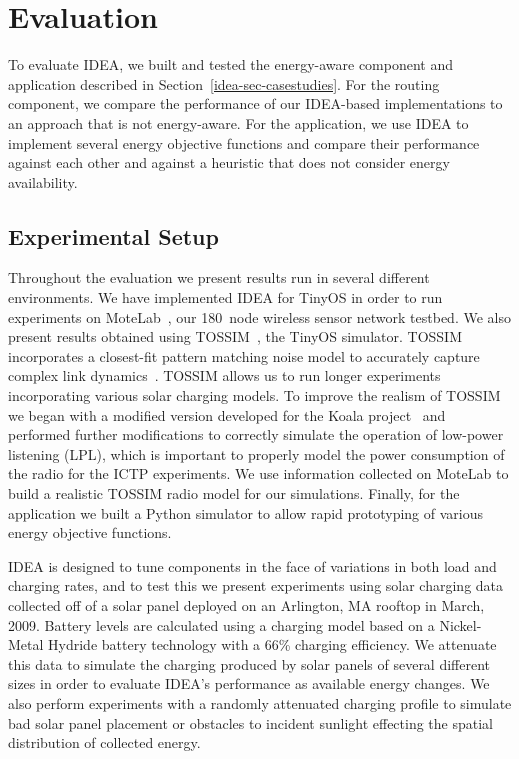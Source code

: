 \section{Evaluation}
\label{idea-sec-evaluation}

To evaluate IDEA, we built and tested the energy-aware component and
application described in Section~\ref{idea-sec-casestudies}. For the routing
component, we compare the performance of our IDEA-based implementations to an
approach that is not energy-aware. For the application, we use IDEA to
implement several energy objective functions and compare their performance
against each other and against a heuristic that does not consider energy
availability.

\subsection{Experimental Setup}
\label{idea-subsec-experimentalsetup}

Throughout the evaluation we present results run in several different
environments. We have implemented IDEA for TinyOS in order to run experiments
on MoteLab~\cite{motelab}, our 180~node wireless sensor network testbed. We
also present results obtained using TOSSIM~\cite{tossim}, the TinyOS
simulator. TOSSIM incorporates a closest-fit pattern matching noise model to
accurately capture complex link dynamics~\cite{cpm-ipsn07}. TOSSIM allows us
to run longer experiments incorporating various solar charging models. To
improve the realism of TOSSIM we began with a modified version developed for
the Koala project~\cite{koala-ipsn08} and performed further modifications to
correctly simulate the operation of low-power listening
(LPL), which is important to properly model the power
consumption of the radio for the ICTP experiments. We use information
collected on MoteLab to build a realistic TOSSIM radio model for our
simulations. Finally, for the application we built a Python simulator to
allow rapid prototyping of various energy objective functions.

IDEA is designed to tune components in the face of variations in both load
and charging rates, and to test this we present experiments using solar
charging data collected off of a solar panel deployed on an Arlington, MA
rooftop in March, 2009. Battery levels are calculated using a charging model
based on a Nickel-Metal Hydride battery technology with a 66\% charging
efficiency. We attenuate this data to simulate the charging produced by solar
panels of several different sizes in order to evaluate IDEA's performance as
available energy changes. We also perform experiments with a randomly
attenuated charging profile to simulate bad solar panel placement or
obstacles to incident sunlight effecting the spatial distribution of
collected energy.

